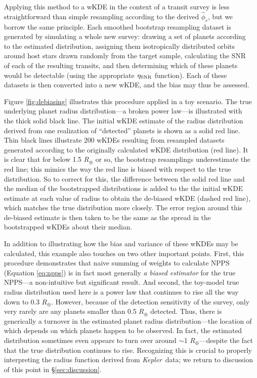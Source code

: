 \documentclass[iop]{emulateapj}
\def\Kepler{\textit{Kepler}}
\def\Rearth{R_\oplus}
\begin{document}
Applying this method to a wKDE in the context of a transit survey is less straightforward than simple resampling according to the derived $\hat\phi_r$, but we borrow the same principle.  Each smoothed bootstrap resampling dataset is generated by simulating a whole new survey: drawing a set of planets according to the estimated distribution, assigning them isotropically distributed orbits around host stars drawn randomly from the target sample, calculating the SNR of each of the resulting transits, and then determining which of these planets would be detectable (using the appropriate $\eta_{\rm SNR}$ function).  Each of these datasets is then converted into a new wKDE, and the bias may thus be assessed.



Figure \ref{fig:debiasing} illustrates this procedure applied in a toy scenario.  The true underlying planet radius distribution---a broken power law---is illustrated with the thick solid black line.  The initial wKDE estimate of the radius distribution derived from one realization of ``detected'' planets is shown as a solid red line.  Thin black lines illustrate 200 wKDEs resulting from resampled datasets generated according to the originally calculated wKDE distribution (red line).  It is clear that for below 1.5 $\Rearth$ or so, the bootstrap resamplings underestimate the red line; this mimics the way the red line is biased with respect to the true distribution.  So to correct for this, the difference between the solid red line and the median of the bootstrapped distributions is added to the the initial wKDE estimate at each value of radius to obtain the de-biased wKDE (dashed red line), which matches the true distribution more closely.  The error region around this de-biased estimate is then taken to be the same as the spread in the bootstrapped wKDEs about their median.  

In addition to illustrating how the bias and variance of these wKDEs may be calculated, this example also touches on two other important points.  First, this procedure demonstrates that naive summing of weights to calculate NPPS (Equation \ref{eq:npps}) is in fact most generally \textit{a biased estimator} for the true NPPS---a non-intuitive but significant result.  And second, the toy-model true radius distribution used here is a power law that continues to rise all the way down to 0.3 $\Rearth$.  However, because of the detection sensitivity of the survey, only very rarely are any planets smaller than 0.5 $\Rearth$ detected.  Thus, there is generically a turnover in the estimated planet radius distribution---the location of which depends on which planets happen to be observed.  In fact, the estimated distribution sometimes even appears to turn over around $\sim$1 $\Rearth$---despite the fact that the true distribution continues to rise.  Recognizing this is crucial to properly interpreting the radius function derived from \Kepler\ data; we return to discussion of this point in \S\ref{sec:discussion}.
\end{document}
